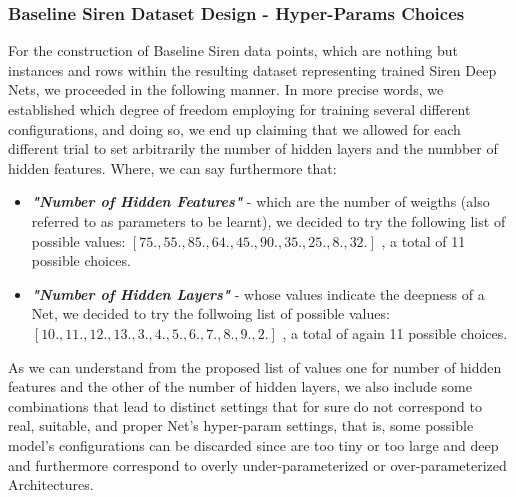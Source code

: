 



\begin{frame}
\frametitle{Baseline Siren Dataset Design - Hyper-Params Choices}
For the construction of Baseline Siren data points, which are nothing but instances and rows within the resulting dataset representing trained Siren Deep Nets, we proceeded in the
following manner. In more precise words, we established which degree of freedom employing for training several different configurations, and doing so, we end up claiming that
we allowed for each different trial to set arbitrarily the number of hidden layers and the numbber of hidden features. Where, we can say furthermore that:

\begin{itemize}
\item \textbf{\textit{"Number of Hidden Features"}} - which are the number of weigths (also referred to as parameters to be learnt), we decided to try the following list of possible values:
$[75., 55., 85., 64., 45., 90., 35., 25.,  8., 32.]$ , a total of 11 possible choices.
\item \textbf{\textit{"Number of Hidden Layers"}} - whose values indicate the deepness of a Net, we decided to try the follwoing list of possible values:
$[10., 11., 12., 13.,  3.,  4.,  5.,  6.,  7.,  8.,  9.,  2.]$ , a total of again 11 possible choices.
\end{itemize}

As we can understand from the proposed list of values one for number of hidden features and the other of the number of hidden layers, we also include some combinations that lead to
distinct settings that for sure do not correspond to real, suitable, and proper Net's hyper-param settings, that is, some possible model's configurations can be discarded since are
too tiny or too large and deep and furthermore correspond to overly under-parameterized or over-parameterized Architectures.

\end{frame}


